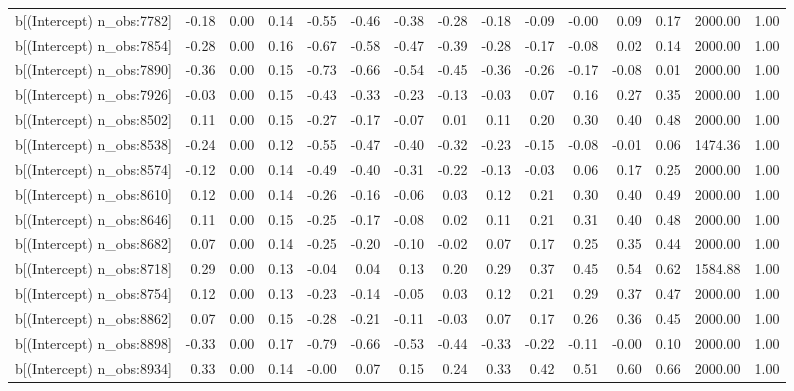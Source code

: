 \begin{table}[ht]
\begin{tabular}{rrrrrrrrrrrrrrr}
  b[(Intercept) n\_obs:7782] & -0.18 & 0.00 & 0.14 & -0.55 & -0.46 & -0.38 & -0.28 & -0.18 & -0.09 & -0.00 & 0.09 & 0.17 & 2000.00 & 1.00 \\ 
  b[(Intercept) n\_obs:7854] & -0.28 & 0.00 & 0.16 & -0.67 & -0.58 & -0.47 & -0.39 & -0.28 & -0.17 & -0.08 & 0.02 & 0.14 & 2000.00 & 1.00 \\ 
  b[(Intercept) n\_obs:7890] & -0.36 & 0.00 & 0.15 & -0.73 & -0.66 & -0.54 & -0.45 & -0.36 & -0.26 & -0.17 & -0.08 & 0.01 & 2000.00 & 1.00 \\ 
  b[(Intercept) n\_obs:7926] & -0.03 & 0.00 & 0.15 & -0.43 & -0.33 & -0.23 & -0.13 & -0.03 & 0.07 & 0.16 & 0.27 & 0.35 & 2000.00 & 1.00 \\ 
  b[(Intercept) n\_obs:8502] & 0.11 & 0.00 & 0.15 & -0.27 & -0.17 & -0.07 & 0.01 & 0.11 & 0.20 & 0.30 & 0.40 & 0.48 & 2000.00 & 1.00 \\ 
  b[(Intercept) n\_obs:8538] & -0.24 & 0.00 & 0.12 & -0.55 & -0.47 & -0.40 & -0.32 & -0.23 & -0.15 & -0.08 & -0.01 & 0.06 & 1474.36 & 1.00 \\ 
  b[(Intercept) n\_obs:8574] & -0.12 & 0.00 & 0.14 & -0.49 & -0.40 & -0.31 & -0.22 & -0.13 & -0.03 & 0.06 & 0.17 & 0.25 & 2000.00 & 1.00 \\ 
  b[(Intercept) n\_obs:8610] & 0.12 & 0.00 & 0.14 & -0.26 & -0.16 & -0.06 & 0.03 & 0.12 & 0.21 & 0.30 & 0.40 & 0.49 & 2000.00 & 1.00 \\ 
  b[(Intercept) n\_obs:8646] & 0.11 & 0.00 & 0.15 & -0.25 & -0.17 & -0.08 & 0.02 & 0.11 & 0.21 & 0.31 & 0.40 & 0.48 & 2000.00 & 1.00 \\ 
  b[(Intercept) n\_obs:8682] & 0.07 & 0.00 & 0.14 & -0.25 & -0.20 & -0.10 & -0.02 & 0.07 & 0.17 & 0.25 & 0.35 & 0.44 & 2000.00 & 1.00 \\ 
  b[(Intercept) n\_obs:8718] & 0.29 & 0.00 & 0.13 & -0.04 & 0.04 & 0.13 & 0.20 & 0.29 & 0.37 & 0.45 & 0.54 & 0.62 & 1584.88 & 1.00 \\ 
  b[(Intercept) n\_obs:8754] & 0.12 & 0.00 & 0.13 & -0.23 & -0.14 & -0.05 & 0.03 & 0.12 & 0.21 & 0.29 & 0.37 & 0.47 & 2000.00 & 1.00 \\ 
  b[(Intercept) n\_obs:8862] & 0.07 & 0.00 & 0.15 & -0.28 & -0.21 & -0.11 & -0.03 & 0.07 & 0.17 & 0.26 & 0.36 & 0.45 & 2000.00 & 1.00 \\ 
  b[(Intercept) n\_obs:8898] & -0.33 & 0.00 & 0.17 & -0.79 & -0.66 & -0.53 & -0.44 & -0.33 & -0.22 & -0.11 & -0.00 & 0.10 & 2000.00 & 1.00 \\ 
  b[(Intercept) n\_obs:8934] & 0.33 & 0.00 & 0.14 & -0.00 & 0.07 & 0.15 & 0.24 & 0.33 & 0.42 & 0.51 & 0.60 & 0.66 & 2000.00 & 1.00 \\ 

\end{tabular}
\end{table}
